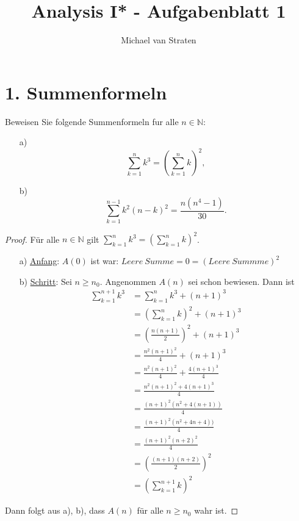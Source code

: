 \documentclass{exam}
\title{Analysis I* - Aufgabenblatt 1}
\author{Michael van Straten}
\begin{document}
\maketitle
\section*{1. Summenformeln}
Beweisen Sie folgende Summenformeln fur alle $n \in \mathbb{N}$:
\begin{enumerate}
	\item[a)]
	      \[
		      \sum_{k = 1}^{n} k^3 = \left(\sum_{k = 1}^{n}k\right)^2,
	      \]
	\item[b)]
	      \[
		      \sum_{k = 1}^{n-1} k^2(n-k)^2 = \frac{n(n^4-1)}{30}.
	      \]
\end{enumerate}
\begin{proof}
	Für alle $n \in \mathbb{N}$ gilt $\sum_{k = 1}^{n} k^3 = \left(\sum_{k = 1}^{n}k\right)^2$.
	\begin{enumerate}
		\item[a)] \underline{Anfang}: $A(0)$ ist war: $Leere\ Summe = 0 = (Leere\ Summme)^2$
		\item[b)] \underline{Schritt}: Sei $n \ge n_0$. Angenommen $A(n)$ sei schon bewiesen.
		      Dann ist \begin{align}
			      \sum_{k = 1}^{n + 1} k^3 & = \sum_{k = 1}^{n}k^3 + (n + 1)^3                                           \\
			                               & = \left(\sum_{k = 1}^{n}k\right)^2 + (n + 1)^3 \tag{Gausische summenformel} \\
			                               & = \left(\frac{n(n+1)}{2}\right)^2 + (n + 1)^3                               \\
			                               & = \frac{n^2(n+1)^2}{4} + (n + 1)^3                                          \\
			                               & = \frac{n^2(n+1)^2}{4} + \frac{4(n + 1)^3}{4}                               \\
			                               & = \frac{n^2(n+1)^2 + 4(n + 1)^3}{4}                                         \\
			                               & = \frac{(n+1)^2(n^2 + 4(n + 1))}{4}                                         \\
			                               & = \frac{(n+1)^2(n^2 + 4n + 4))}{4}                                          \\
			                               & = \frac{(n+1)^2(n +2)^2}{4}                                                 \\
			                               & = \left(\frac{(n+1)(n +2)}{2}\right)^2                                      \\
			                               & = \left(\sum_{k=1}^{n+1}k\right)^2
		      \end{align}
	\end{enumerate}
	Dann folgt aus a), b), dass $A(n)$ für alle $n \ge n_0$ wahr ist.
\end{proof}
\end{document}
